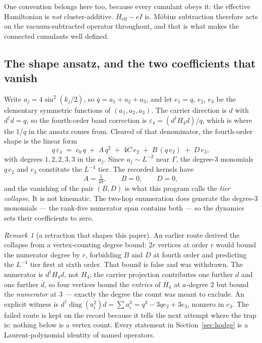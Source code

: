 \documentclass[11pt]{article}
\theoremstyle{definition}
\theoremstyle{remark}
\newtheorem{remark}[theorem]{Remark}
\newcommand{\dg}{^{\dagger}}
\begin{document}
One convention belongs here too, because every cumulant obeys it: the effective
Hamiltonian is \emph{not} cluster-additive. $H_{\mathrm{eff}}-eI$ is. Möbius
subtraction therefore acts on the vacuum-subtracted operator throughout, and
that is what makes the connected cumulants well defined.

\subsection{The shape ansatz, and the two coefficients that vanish}

Write $a_j=4\sin^2(k_j/2)$, so $q=a_1+a_2+a_3$, and let $e_1=q$, $e_2$, $e_3$
be the elementary symmetric functions of $(a_1,a_2,a_3)$. The carrier direction
is $d$ with $d\dg d=q$, so the fourth-order band correction is
$\varepsilon_4=(d\dg H_4 d)/q$, which is where the $1/q$ in the ansatz comes
from. Cleared of that denominator, the fourth-order shape is the linear form
\begin{equation}\label{eq:ansatz}
  q\,\varepsilon_4 \;=\; c_0\,q \;+\; A\,q^2 \;+\; 4C\,e_2
                  \;+\; B\,(q\,e_2) \;+\; D\,e_3 ,
\end{equation}
with degrees $1,2,2,3,3$ in the $a_j$. Since $a_j\sim L^{-2}$ near $\Gamma$,
the degree-$3$ monomials $q\,e_2$ and $e_3$ constitute the $L^{-4}$ tier. The
recorded kernels have
\begin{equation}\label{eq:collapse}
  A=\tfrac{5}{48},\qquad B=0,\qquad D=0 ,
\end{equation}
and the vanishing of the pair $(B,D)$ is what this program calls the
\emph{tier collapse}. It is not kinematic. The two-hop enumeration does
generate the degree-$3$ monomials --- the rank-five numerator span contains
both --- so the dynamics sets their coefficients to zero.

\begin{remark}[a retraction that shapes this paper]\label{rem:retraction}
An earlier route derived the collapse from a vertex-counting degree bound:
$2r$ vertices at order $r$ would bound the numerator degree by $r$, forbidding
$B$ and $D$ at fourth order and predicting the $L^{-4}$ tier first at sixth
order. That bound is false and was withdrawn. The numerator is $d\dg H_4d$,
not $H_4$; the carrier projection contributes one further $d$ and one further
$\bar d$, so four vertices bound the \emph{entries} of $H_4$ at $a$-degree $2$
but bound the \emph{numerator} at $3$ --- exactly the degree the count was
meant to exclude. An explicit witness is
$d\dg\operatorname{diag}(a_i^2)d=\sum a_i^3=q^3-3qe_2+3e_3$, nonzero in $e_3$.
The failed route is kept on the record because it tells the next attempt where
the trap is: nothing below is a vertex count. Every statement in
Section~\ref{sec:hodge} is a Laurent-polynomial identity of named operators.
\end{remark}
\end{document}
